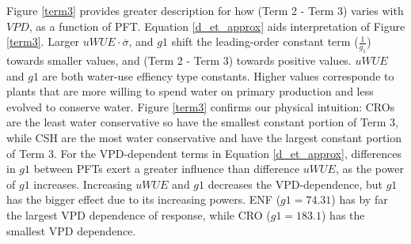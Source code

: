 \documentclass[draft,linenumbers]{agujournal}
\begin{document}
Figure \ref{term3} provides greater description for how (Term 2 - Term 3) varies with $VPD$, as a function of PFT. Equation \ref{d_et_approx} aids interpretation of Figure \ref{term3}. Larger $uWUE\cdot\overline{\sigma}$, and $g1$ shift the leading-order constant term ($\frac{1}{g_1}$) towards smaller values, and (Term 2 - Term 3) towards positive values. $uWUE$ and $g1$ are both water-use effiency type constants. Higher values corresponde to plants that are more willing to spend water on primary production and less evolved to conserve water. Figure \ref{term3} confirms our physical intuition: CROs are the least water conservative so have the smallest constant portion of Term 3, while CSH are the most water conservative and have the largest constant portion of Term 3. For the VPD-dependent terms in Equation \ref{d_et_approx}, differences in $g1$ between PFTs exert a greater influence than difference $uWUE$, as the power of $g1$ increases. Increasing $uWUE$ and $g1$ decreases the VPD-dependence, but $g1$ has the bigger effect due to its increasing powers. ENF ($g1 = 74.31$) has by far the largest VPD dependence of response, while CRO ($g1 = 183.1$) has the smallest VPD dependence.  
 
\end{document}

